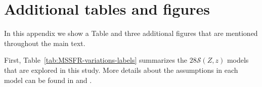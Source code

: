 \documentclass[fleqn,usenatbib]{mnras}
\newcommand{\SFRD}{\ensuremath{\mathcal{S}(Z,z)}\xspace}
\newcommand{\NmodelsMSSFR}{\ensuremath{28}\xspace}
\begin{document}








\appendix



\section{Additional tables and figures}
%
In this appendix we show a Table and three additional figures that are mentioned throughout the main text. 


First, Table~\ref{tab:MSSFR-variations-labels} summarizes the \NmodelsMSSFR \SFRD models that are explored in this study. More details about the assumptions in each model can be found in \citet[][]{Broekgaarden:2021} and \citet{Neijssel:2019}.
\end{document}
